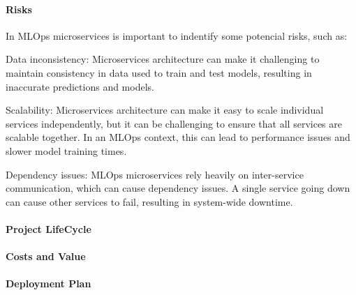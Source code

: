 \paragraph{Risks}
In MLOps microservices is important to indentify some potencial risks, such as:

Data inconsistency: Microservices architecture can make it challenging to maintain consistency in data used to train and test models, resulting in inaccurate predictions and models.

Scalability: Microservices architecture can make it easy to scale individual services independently, but it can be challenging to ensure that all services are scalable together. In an MLOps context, this can lead to performance issues and slower model training times.

Dependency issues: MLOps microservices rely heavily on inter-service communication, which can cause dependency issues. A single service going down can cause other services to fail, resulting in system-wide downtime.


\paragraph{Project LifeCycle}

\paragraph{Costs and Value}

\paragraph{Deployment Plan}